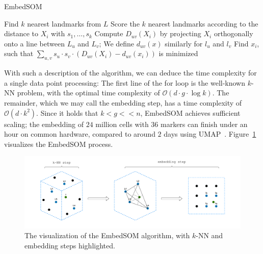 \begin{algorithm}[t]
    \caption{EmbedSOM}
    \label{alg01:esom}
    \begin{algorithmic}[1]
         
            \State Find $k$ nearest landmarks from $L$
            \State Score the $k$ nearest landmarks according to the distance to $X_i$ with $s_1, \dots, s_k$
             
                \State Compute $D_{uv}(X_i)$ by projecting $X_i$ orthogonally onto a line between $L_u$ and $L_v$; We define $d_{uv}(x)$ similarly for $l_u$ and $l_v$
            \EndFor
            \State Find $x_i$, such that $\sum_{u, v} s_u \cdot s_v \cdot (D_{uv}(X_i) - d_{uv}(x_i))$ is minimized
        \EndFor
        \EndProcedure
    \end{algorithmic}
\end{algorithm}

With such a description of the algorithm, we can deduce the time complexity for a single data point processing: The first line of the for loop is the well-known $k$-NN problem, with the optimal time complexity of $\mathcal{O}(d \cdot g \cdot \log k)$. The remainder, which we may call the embedding step, has a time complexity of $\mathcal{O}(d \cdot k^2)$. Since it holds that $k < g << n$, EmbedSOM achieves sufficient scaling; the embedding of $24$ million cells with $36$ markers can finish under an hour on common hardware, compared to around $2$ days using UMAP~\cite{kratochvil2019som}. Figure~\ref{fig:embedsom} visualizes the EmbedSOM process.

\begin{figure}[h]
    \centering
    \includegraphics[width=\textwidth]{img/embedsom.drawio.pdf}
    \caption{The visualization of the EmbedSOM algorithm, with $k$-NN and embedding steps highlighted.}
    \label{fig:embedsom}
\end{figure}

